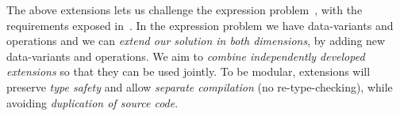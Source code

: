 %
%
% 
%



The above extensions lets us challenge the expression problem~\cite{wadler1998expression},
with the requirements exposed in~\cite{Zenger-Odersky2005}.
In the expression problem we have data-variants and operations and we can
\emph{extend our solution in both dimensions},
by adding new data-variants and operations.
We aim to \emph{combine independently developed extensions} so
that they can be used jointly.
To be modular, extensions will preserve \emph{type safety}
and allow \emph{separate compilation} (no re-type-checking),
while avoiding \emph{duplication of source code}.

